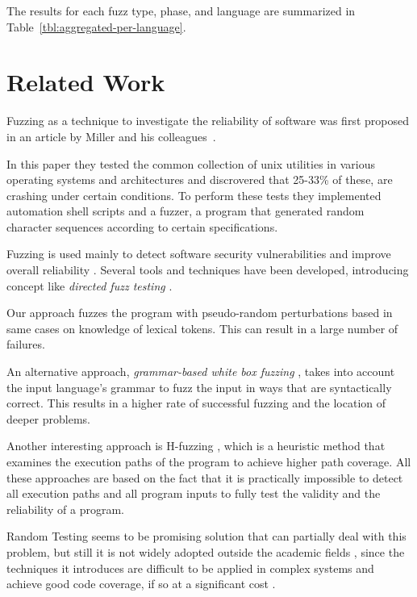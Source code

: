 \documentclass[10pt]{sigplanconf}
\begin{document}
The results for each fuzz type, phase, and language are summarized in
Table~\ref{tbl:aggregated-per-language}.



\section{Related Work} %
\label{sec:related}

Fuzzing as a technique to investigate the reliability of software
was first proposed in an article by Miller and his colleagues~\cite{MFS90}.

In this paper they tested the common collection of {\sc unix}
utilities in various operating systems and architectures and discrovered that
25-33\% of these, are crashing under certain conditions. To perform these tests
they implemented automation shell scripts and a fuzzer, a program that generated
random character sequences according to certain specifications.

Fuzzing is used mainly to detect software security vulnerabilities and 
improve overall reliability \cite{TJC08,GODE07}. Several tools and techniques \cite{WWGZ11}
have been developed, introducing concept like \textit{directed fuzz testing} \cite{GLRI09}.

Our approach fuzzes the program with pseudo-random
perturbations based in same cases on knowledge of
lexical tokens. This can result in a large number of failures.

An alternative approach, {\em grammar-based white box fuzzing} \cite{God08},
takes into account the input language's grammar to fuzz the input in
ways that are syntactically correct.
This results in a higher rate of successful fuzzing and the location
of deeper problems.

Another interesting approach is H-fuzzing \cite{ZWZH11}, which is a heuristic method that examines the execution paths
of the program to achieve higher path coverage. All these approaches are based on the fact that it is practically impossible to detect all
execution paths and all program inputs to fully test the validity and the reliability of a program.

Random Testing \cite{HAM06} seems to be promising solution that can partially deal with this problem,
but still it is not widely adopted outside the academic fields \cite{GGBO07}, since the techniques it 
introduces are difficult to be applied in complex systems and achieve good code coverage, if so at a significant cost \cite{RAWO06}.
\end{document}
